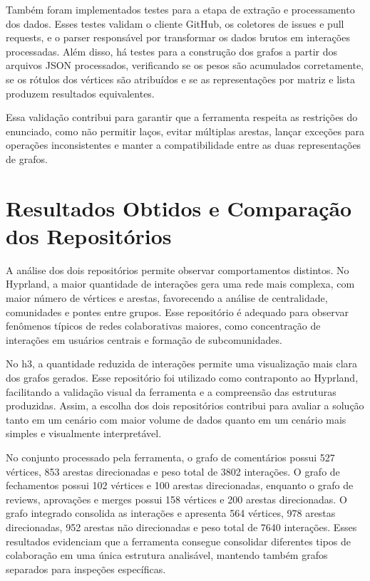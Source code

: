 \documentclass[12pt]{article}
\begin{document}
Também foram implementados testes para a etapa de extração e processamento dos
dados. Esses testes validam o cliente GitHub, os coletores de issues e pull
requests, e o parser responsável por transformar os dados brutos em interações
processadas. Além disso, há testes para a construção dos grafos a partir dos
arquivos JSON processados, verificando se os pesos são acumulados corretamente,
se os rótulos dos vértices são atribuídos e se as representações por matriz e
lista produzem resultados equivalentes.

Essa validação contribui para garantir que a ferramenta respeita as restrições
do enunciado, como não permitir laços, evitar múltiplas arestas, lançar
exceções para operações inconsistentes e manter a compatibilidade entre as duas
representações de grafos.

\section{Resultados Obtidos e Comparação dos Repositórios}

A análise dos dois repositórios permite observar comportamentos distintos. No
Hyprland, a maior quantidade de interações gera uma rede mais complexa, com
maior número de vértices e arestas, favorecendo a análise de centralidade,
comunidades e pontes entre grupos. Esse repositório é adequado para observar
fenômenos típicos de redes colaborativas maiores, como concentração de
interações em usuários centrais e formação de subcomunidades.

No h3, a quantidade reduzida de interações permite uma visualização mais clara
dos grafos gerados. Esse repositório foi utilizado como contraponto ao
Hyprland, facilitando a validação visual da ferramenta e a compreensão das
estruturas produzidas. Assim, a escolha dos dois repositórios contribui para
avaliar a solução tanto em um cenário com maior volume de dados quanto em um
cenário mais simples e visualmente interpretável.

No conjunto processado pela ferramenta, o grafo de comentários possui 527
vértices, 853 arestas direcionadas e peso total de 3802 interações. O grafo de
fechamentos possui 102 vértices e 100 arestas direcionadas, enquanto o grafo de
reviews, aprovações e merges possui 158 vértices e 200 arestas direcionadas. O
grafo integrado consolida as interações e apresenta 564 vértices, 978 arestas
direcionadas, 952 arestas não direcionadas e peso total de 7640 interações.
Esses resultados evidenciam que a ferramenta consegue consolidar diferentes
tipos de colaboração em uma única estrutura analisável, mantendo também grafos
separados para inspeções específicas.
\end{document}
